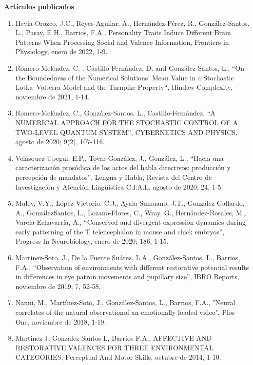 \textbf{Artículos publicados}

\hfill

\begin{enumerate}

\item Hevia-Orozco, J.C., Reyes-Aguilar, A., Hernández-Pérez, R., González-Santos, L., Pasay, E H., Barrios, F.A., Personality 
Traits Induce Different Brain Patterns When Processing Social and Valence Information, Frontiers in Physiology, enero de 2022, 1-9.

\item Romero-Meléndez, C. , Castillo-Fernández, D. and González-Santos, L., “On the Boundedness of the Numerical Solutions’ 
Mean Value in a Stochastic Lotka–Volterra Model and the Turnpike Property“, Hindaw Complexity, noviembre de 2021, 1-14.

\item Romero-Meléndez, C., González-Santos, L., Castillo-Fernández, “A NUMERICAL APPROACH FOR THE STOCHASTIC CONTROL OF A 
TWO-LEVEL QUANTUM SYSTEM”, CYBERNETICS AND PHYSICS, agosto de 2020; 9(2), 107-116.

\item Velásquez-Upegui, E.P., Tovar-González, J., González, L., “Hacia una caracterización prosódica de los actos del habla 
directivos: producción y percepción de mandatos”, Lengua y Habla, Revista del Centro de Investigación y Atención 
Lingüística C.I.A.L, agosto de 2020; 24, 1-5.

\item Muley, V.Y., López-Victorio, C.J., Ayala-Sumuano, J.T., González-Gallardo, A., GonzálezSantos, L., Lozano-Flores, C., 
Wray, G., Hernández-Rosales, M., Varela-Echavarría, A., “Conserved and divergent expression dynamics during early 
patterning of the T telencephalon in mouse and chick embryos”, Progress In Neurobiology, enero de 2020; 186, 1-15.

\item Martínez-Soto, J., De la Fuente Suárez, L.A., González-Santos, L., Barrios, F.A., “Observation of environments with 
different restorative potential results in differences in eye patron movements and pupillary size”, IBRO Reports, noviembre 
de 2019; 7, 52-58.

\item Nanni, M., Martínez-Soto, J., González-Santos, L., Barrios, F.A., "Neural correlates of the natural observationof an 
emotionally loaded video", Plos One, noviembre de 2018, 1-19.

\item Martinez J, Gonzalez-Santos L, Barrios F.A., AFFECTIVE AND RESTORATIVE VALENCES FOR THREE ENVIRONMENTAL CATEGORIES, 
Perceptual And Motor Skills, octubre de 2014, 1-10.


\end{enumerate}
